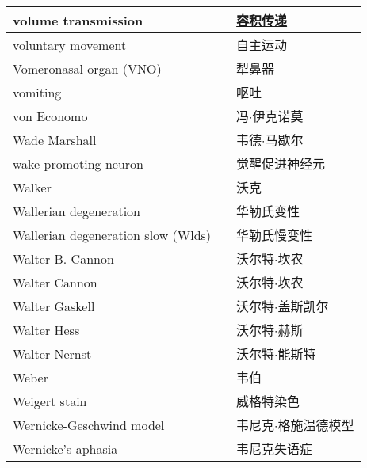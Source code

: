 \begin{longtable}{lll}
	\midrule
	volume transmission  &&  \href{https://www.cnblogs.com/Engineblogs/p/14832346.html}{容积传递} \\
	
	\midrule
	voluntary movement  &&  自主运动 \\
	
	\midrule
	Vomeronasal organ (VNO)  && 犁鼻器  \\
	
	\midrule
	vomiting  && 呕吐  \\
	
	\midrule
	von Economo   && 冯$\cdot$伊克诺莫  \\
	
	\midrule
	Wade Marshall  && 韦德$\cdot$马歇尔  \\
	
	\midrule
	wake-promoting neuron  && 觉醒促进神经元  \\
	
	\midrule
	Walker  && 沃克  \\
	
	\midrule
	Wallerian degeneration  && 华勒氏变性  \\
	
	\midrule
	Wallerian degeneration slow (Wlds) && 华勒氏慢变性  \\
	
	\midrule
	Walter B. Cannon  && 沃尔特$\cdot$坎农  \\
	
	\midrule
	Walter Cannon  && 沃尔特$\cdot$坎农  \\
	
	\midrule
	Walter Gaskell  && 沃尔特$\cdot$盖斯凯尔  \\
	
	\midrule
	Walter Hess  && 沃尔特$\cdot$赫斯  \\
	
	\midrule
	Walter Nernst  && 沃尔特$\cdot$能斯特  \\
	
	\midrule
	Weber  && 韦伯  \\
	
	\midrule
	Weigert stain  && 威格特染色  \\
	
	\midrule
	Wernicke-Geschwind model  && 韦尼克$\cdot$格施温德模型  \\
	
	\midrule
	Wernicke's aphasia  && 韦尼克失语症  \\
	

\end{longtable}
